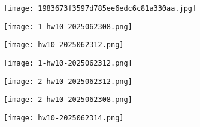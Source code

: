 \begin{figure}[H]
\centering
\texttt{[image: 1983673f3597d785ee6edc6c81a330aa.jpg]}
\label{}
\end{figure}

\begin{exercise}
\begin{figure}[H]
\centering
\texttt{[image: 1-hw10-2025062308.png]}
\label{}
\end{figure}
\end{exercise}
\begin{figure}[H]
\centering
\texttt{[image: hw10-2025062312.png]}
\label{}
\end{figure}
\begin{figure}[H]
\centering
\texttt{[image: 1-hw10-2025062312.png]}
\label{}
\end{figure}
\begin{figure}[H]
\centering
\texttt{[image: 2-hw10-2025062312.png]}
\label{}
\end{figure}

\begin{exercise}
\begin{figure}[H]
\centering
\texttt{[image: 2-hw10-2025062308.png]}
\label{}
\end{figure}
\end{exercise}
\begin{figure}[H]
\centering
\texttt{[image: hw10-2025062314.png]}
\label{}
\end{figure}

